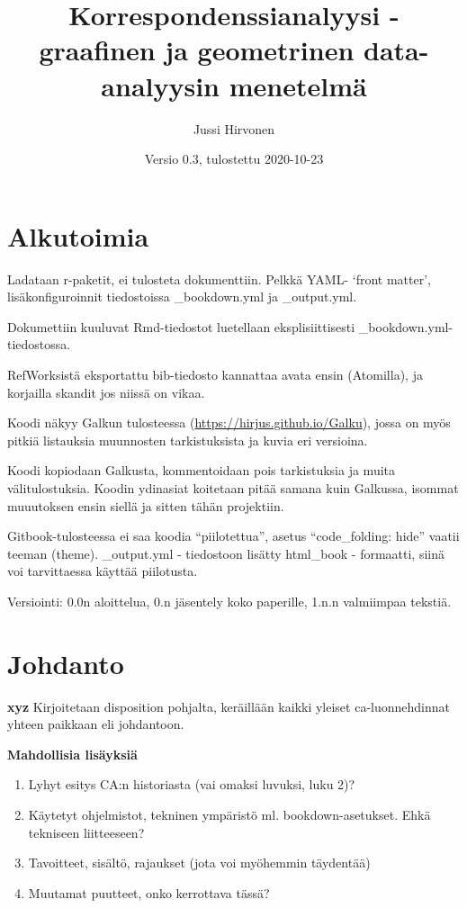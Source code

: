\documentclass[
  finnish,
]{book}
\title{Korrespondenssianalyysi - graafinen ja geometrinen data-analyysin menetelmä}
\author{Jussi Hirvonen}
\date{Versio 0.3, tulostettu 2020-10-23}
\begin{document}
\maketitle

{
\setcounter{tocdepth}{2}
\tableofcontents
}
\hypertarget{alkutoimia}{%
\chapter*{Alkutoimia}\label{alkutoimia}}

Ladataan r-paketit, ei tulosteta dokumenttiin. Pelkkä YAML- `front matter',
lisäkonfiguroinnit tiedostoissa \_bookdown.yml ja \_output.yml.

Dokumettiin kuuluvat Rmd-tiedostot luetellaan eksplisiittisesti
\_bookdown.yml-tiedostossa.

RefWorksistä eksportattu bib-tiedosto kannattaa avata ensin (Atomilla),
ja korjailla skandit jos niissä on vikaa.

Koodi näkyy Galkun tulosteessa (\url{https://hirjus.github.io/Galku}), jossa on myös
pitkiä listauksia muunnosten tarkistuksista ja kuvia eri versioina.

Koodi kopiodaan Galkusta, kommentoidaan pois tarkistuksia ja muita välitulostuksia.
Koodin ydinasiat koitetaan pitää samana kuin Galkussa, isommat muuutoksen ensin siellä
ja sitten tähän projektiin.

Gitbook-tulosteessa ei saa koodia ``piilotettua'', asetus ``code\_folding: hide'' vaatii teeman (theme). \_output.yml - tiedostoon lisätty html\_book - formaatti, siinä voi tarvittaessa käyttää piilotusta.

Versiointi: 0.0n aloittelua, 0.n jäsentely koko paperille, 1.n.n valmiimpaa tekstiä.

\hypertarget{johdanto}{%
\chapter{Johdanto}\label{johdanto}}

\textbf{xyz} Kirjoitetaan disposition pohjalta, keräillään kaikki yleiset
ca-luonnehdinnat yhteen paikkaan eli johdantoon.

\textbf{Mahdollisia lisäyksiä}

\begin{enumerate}
\def\labelenumi{\arabic{enumi}.}
\item
  Lyhyt esitys CA:n historiasta (vai omaksi luvuksi, luku 2)?
\item
  Käytetyt ohjelmistot, tekninen ympäristö ml. bookdown-asetukset.
  Ehkä tekniseen liitteeseen?
\item
  Tavoitteet, sisältö, rajaukset (jota voi myöhemmin täydentää)
\item
  Muutamat puutteet, onko kerrottava tässä?
\end{enumerate}
\end{document}
